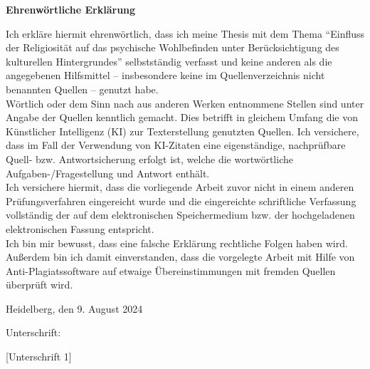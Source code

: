 \newpage
\noindent \fontsize{18pt}{0pt}\textbf{Ehrenwörtliche Erklärung}
\parskip=32pt

\noindent Ich erkläre hiermit ehrenwörtlich, dass ich meine Thesis mit dem Thema \enquote{Einfluss der Religiosität auf das psychische Wohlbefinden unter Berücksichtigung des kulturellen Hintergrundes} selbstständig verfasst und keine anderen als die angegebenen Hilfsmittel – insbesondere keine im Quellenverzeichnis nicht benannten Quellen – genutzt habe. \\
Wörtlich oder dem Sinn nach aus anderen Werken entnommene Stellen sind unter Angabe der Quellen kenntlich gemacht. Dies betrifft in gleichem Umfang die von Künstlicher Intelligenz (KI) zur Texterstellung genutzten Quellen. Ich versichere, dass im Fall der Verwendung von KI-Zitaten eine eigenständige, nachprüfbare Quell- bzw. Antwortsicherung erfolgt ist, welche die wortwörtliche Aufgaben-/Fragestellung und Antwort enthält. \\
Ich versichere hiermit, dass die vorliegende Arbeit zuvor nicht in einem anderen 
Prüfungsverfahren eingereicht wurde und die eingereichte schriftliche Verfassung vollständig der auf dem elektronischen Speichermedium bzw. der hochgeladenen elektronischen Fassung entspricht. \\
Ich bin mir bewusst, dass eine falsche Erklärung rechtliche Folgen haben wird. Außerdem bin ich damit einverstanden, dass die vorgelegte Arbeit mit Hilfe von Anti-Plagiatssoftware auf etwaige Übereinstimmungen mit fremden Quellen überprüft wird.

\parskip=32pt

\noindent Heidelberg, den 9. August 2024 %
\parskip=32pt

\noindent Unterschrift: %

[Unterschrift 1]

